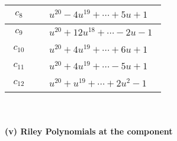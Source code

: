 \documentclass[1p]{elsarticle_modified}
\theoremstyle{definition}
\begin{document}
\begin{tabular}{m{50pt}|m{274pt}}
\hline $$\begin{aligned}c_{8}\end{aligned}$$&$\begin{aligned}
&u^{20}-4 u^{19}+\cdots+5 u+1
\end{aligned}$\\
\hline $$\begin{aligned}c_{9}\end{aligned}$$&$\begin{aligned}
&u^{20}+12 u^{18}+\cdots-2 u-1
\end{aligned}$\\
\hline $$\begin{aligned}c_{10}\end{aligned}$$&$\begin{aligned}
&u^{20}+4 u^{19}+\cdots+6 u+1
\end{aligned}$\\
\hline $$\begin{aligned}c_{11}\end{aligned}$$&$\begin{aligned}
&u^{20}+4 u^{19}+\cdots-5 u+1
\end{aligned}$\\
\hline $$\begin{aligned}c_{12}\end{aligned}$$&$\begin{aligned}
&u^{20}+u^{19}+\cdots+2 u^2-1
\end{aligned}$\\
\hline
\end{tabular}\\~\\
\newpage\renewcommand{\arraystretch}{1}
\flushleft \textbf{(v) Riley Polynomials at the component}\newline \\
\end{document}
